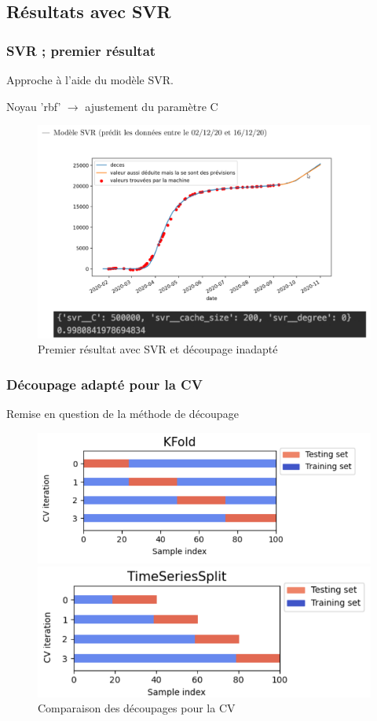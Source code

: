 \documentclass{beamer}
\begin{document}
\subsection{Résultats avec SVR}
\begin{frame}
	\frametitle{SVR ; premier résultat}
	Approche à l'aide du modèle SVR. 
	
	Noyau 'rbf' $\rightarrow$ ajustement du paramètre C
	\begin{figure}[tc]
		\includegraphics[scale=0.2]{SVR_premierdecoup}
		\centering
		\caption{Premier résultat avec SVR et découpage inadapté}
	\end{figure}
\end{frame}

\begin{frame}
	\frametitle{Découpage adapté pour la CV}
		Remise en question de la méthode de découpage
		\begin{figure}[h]
			\centering
			\begin{minipage}{0.5\textwidth}
				\includegraphics[scale=0.3]{kfold}
			\end{minipage}
			\centering
			\begin{minipage}{0.5\textwidth}
				\includegraphics[scale=0.3]{tscv}
			\end{minipage}
		\caption{Comparaison des découpages pour la CV}
		\end{figure}
\end{frame}
\end{document}
